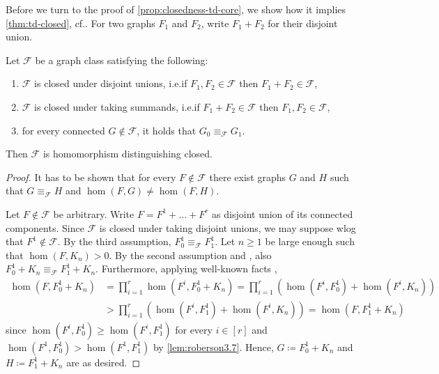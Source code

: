 \documentclass[a4paper,UKenglish,cleveref, autoref, thm-restate]{lipics-v2021}
\begin{document}
Before we turn to the proof of \cref{prop:closedness-td-core}, we show how it implies \cref{thm:td-closed}, cf.\@ \cite[Theorem~4.7]{roberson_oddomorphisms_2022}. For two graphs $F_1$ and $F_2$, write $F_1 + F_2$ for their disjoint union.

\begin{proposition} \label{prop:closed-core}
	Let $\mathcal{F}$ be a graph class satisfying the following:
	\begin{enumerate}
		\item $\mathcal{F}$ is closed under disjoint unions, i.e.\@ if $F_1, F_2 \in \mathcal{F}$ then $F_1 + F_2 \in \mathcal{F}$,
		\item $\mathcal{F}$ is closed under taking summands, i.e.\@ if $F_1 + F_2 \in \mathcal{F}$ then $F_1, F_2 \in \mathcal{F}$,
		\item for every connected $G \not\in \mathcal{F}$, it holds that $G_0 \equiv_{\mathcal{F}} G_1$.
	\end{enumerate}
	Then $\mathcal{F}$ is homomorphism distinguishing closed.
\end{proposition}
\begin{proof}
	 It has to be shown that for every $F \not\in \mathcal{F}$ there exist graphs $G$ and $H$ such that
	 $G \equiv_{\mathcal{F}} H$ and $\hom(F, G) \neq \hom(F, H)$.
	 
	 Let $F \not\in \mathcal{F}$ be arbitrary. Write $F = F^1 + \dots + F^r$ as disjoint union of its connected components. Since $\mathcal{F}$ is closed under taking disjoint unions, we may suppose wlog that $F^1 \not\in \mathcal{F}$.
	 By the third assumption, $F^1_0 \equiv_{\mathcal{F}} F^1_1$.
	 Let $n \geq 1$ be large enough such that $\hom(F, K_n) > 0$.
	 By the second assumption and \cite[Theorem~5]{seppelt_logical_2023}, also $F^1_0 + K_n \equiv_{\mathcal{F}} F^1_1 + K_n$. Furthermore, applying well-known facts \cite[(5.28)--(5.30)]{lovasz_large_2012},
	 \begin{align*}
	 	\hom(F, F^1_0 + K_n) 
	 	&= \prod_{i = 1}^r \hom(F^i, F^1_0 + K_n)
	 	= \prod_{i = 1}^r \left(\hom(F^i, F^1_0) + \hom(F^i, K_n)\right) \\
	 	& > \prod_{i = 1}^r \left(\hom(F^i, F^1_1) + \hom(F^i, K_n)\right) = \hom(F, F^1_1 + K_n)
	 \end{align*}
 	since $\hom(F^i, F^1_0) \geq \hom(F^i, F^1_1)$ for every $i \in [r]$ and $\hom(F^1, F^1_0) > \hom(F^1, F^1_1)$ by \cref{lem:roberson3.7}.
 	Hence, $G \coloneqq F^1_0 + K_n$ and $H \coloneqq F^1_1 + K_n$ are as desired.
\end{proof}
\end{document}
